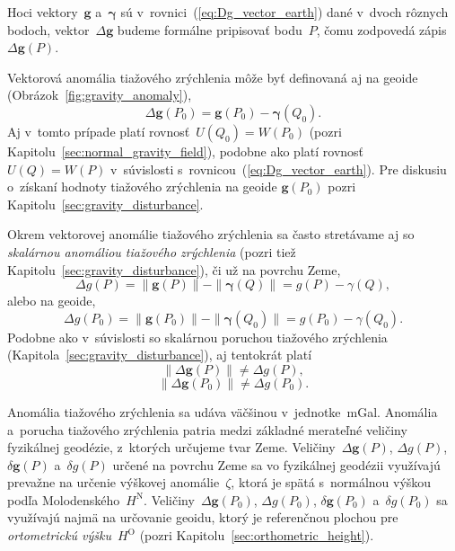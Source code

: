\documentclass[a4paper, 12pt]{book}
\let\vec\mathbf
\begin{document}
Hoci vektory~$\vec g$ a~$\boldsymbol\gamma$ sú 
v~rovnici~(\ref{eq:Dg_vector_earth}) dané v~dvoch rôznych bodoch, 
vektor~$\Delta \vec g$ budeme formálne pripisovať bodu~$P$, čomu zodpovedá 
zápis~$\Delta \vec g(P)$.

Vektorová anomália tiažového zrýchlenia môže byť definovaná aj na geoide 
(Obrázok~\ref{fig:gravity_anomaly}),
%
\begin{equation}
\label{eq:Dg_vector_geoid}
\Delta \vec g(P_0) = \vec g(P_0) - \boldsymbol\gamma(Q_0){.}
\end{equation}
%
Aj v~tomto prípade platí rovnosť~$U(Q_0) = W(P_0)$ (pozri 
Kapitolu~\ref{sec:normal_gravity_field}), podobne ako platí rovnosť $U(Q) 
= W(P)$ v~súvislosti s~rovnicou~(\ref{eq:Dg_vector_earth}).  Pre diskusiu 
o~získaní hodnoty tiažového zrýchlenia na geoide $\vec g(P_0)$ pozri 
Kapitolu~\ref{sec:gravity_disturbance}.

Okrem vektorovej anomálie tiažového zrýchlenia sa často stretávame aj so 
\emph{skalárnou anomáliou tiažového zrýchlenia} (pozri tiež 
Kapitolu~\ref{sec:gravity_disturbance}), či už na povrchu Zeme,
%
\begin{equation}
\label{eq:Dg_scalar_earth}
\Delta g(P) = \| \vec g(P) \| - \| \boldsymbol \gamma(Q) \| = g(P) 
- \gamma(Q){,}
\end{equation}
%
alebo na geoide,
%
\begin{equation}
\label{eq:Dg_scalar_geoid}
\Delta g(P_0) = \| \vec g(P_0) \| - \| \boldsymbol \gamma(Q_0) \| = g(P_0) 
- \gamma(Q_0){.}
\end{equation}
%
Podobne ako v~súvislosti so skalárnou poruchou tiažového zrýchlenia 
(Kapitola~\ref{sec:gravity_disturbance}), aj tentokrát platí
%
\begin{equation}
\| \Delta \vec g(P) \| \neq \Delta g(P){,}
\end{equation}
%
\begin{equation}
\| \Delta \vec g(P_0) \| \neq \Delta g(P_0){.}
\end{equation}

Anomália tiažového zrýchlenia sa udáva väčšinou v~jednotke~mGal.  Anomália 
a~porucha tiažového zrýchlenia patria medzi základné merateľné veličiny 
fyzikálnej geodézie, z~ktorých určujeme tvar Zeme.  Veličiny~$\Delta \vec 
g(P)$, $\Delta g(P)$, $\delta \vec g(P)$ a~$\delta g(P)$ určené na povrchu Zeme 
sa vo fyzikálnej geodézii využívajú prevažne na určenie výškovej 
anomálie~$\zeta$, ktorá je spätá s~normálnou výškou podľa 
Molodenského~$H^\mathrm{N}$.  Veličiny~$\Delta \vec g(P_0)$, $\Delta g(P_0)$, 
$\delta \vec g(P_0)$ a~$\delta g(P_0)$ sa využívajú najmä na určovanie geoidu, 
ktorý je referenčnou plochou pre \emph{ortometrickú výšku}~$H^\mathrm{O}$ 
(pozri Kapitolu~\ref{sec:orthometric_height}).
\end{document}
